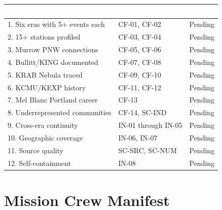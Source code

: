 \documentclass[11pt,letterpaper]{article}
\newcommand{\tableheader}[1]{\textbf{\sffamily\textcolor{white}{#1}}}
\begin{document}
\begin{center}
\begin{tabularx}{\textwidth}{XL{3cm}C{1.5cm}}
\toprule
{}
\tableheader{Success Criterion} & \tableheader{Test ID(s)} & \tableheader{Status} \\
. Six eras with 5+ events each & CF-01, CF-02 & Pending \\
2. 15+ stations profiled & CF-03, CF-04 & Pending \\
3. Murrow PNW connections & CF-05, CF-06 & Pending \\
4. Bullitt/KING documented & CF-07, CF-08 & Pending \\
5. KRAB Nebula traced & CF-09, CF-10 & Pending \\
6. KCMU/KEXP history & CF-11, CF-12 & Pending \\
7. Mel Blanc Portland career & CF-13 & Pending \\
8. Underrepresented communities & CF-14, SC-IND & Pending \\
9. Cross-era continuity & IN-01 through IN-05 & Pending \\
10. Geographic coverage & IN-06, IN-07 & Pending \\
11. Source quality & SC-SRC, SC-NUM & Pending \\
12. Self-containment & IN-08 & Pending \\
\bottomrule
\end{tabularx}
\end{center}

\section{Mission Crew Manifest}
\end{document}
